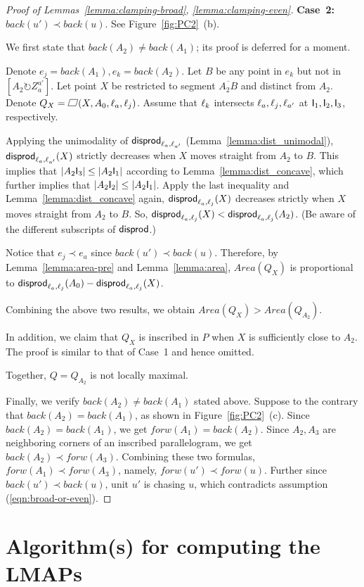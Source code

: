 \documentclass{ws-ijcga}
\begin{document}
\begin{proof}[Proof of Lemmas~\ref{lemma:clamping-broad}, \ref{lemma:clamping-even}]
\bigskip \noindent \textbf{Case~2:} $back(u')\prec back(u)$. See Figure~\ref{fig:PC2}~(b).

We first state that $back(A_2)\neq back(A_1)$; its proof is deferred for a moment.

Denote $e_j=back(A_1),e_k=back(A_2)$.
Let $B$ be any point in $e_k$ but not in $[A_2\circlearrowright Z_a^{a'}]$.
Let point $X$ be restricted to segment $\overline{A_2B}$ and distinct from $A_2$.
Denote $Q_X=\parallelogram(X,A_0,\el_a,\el_j)$.
Assume that $\ell_k$ intersects $\ell_a,\ell_j,\ell_{a'}$ at $\mathsf{I}_1,\mathsf{I}_2,\mathsf{I}_3$, respectively.\smallskip

Applying the unimodality of $\mathsf{disprod}_{\ell_a,\ell_{a'}}$ (Lemma~\ref{lemma:dist_unimodal}), $\mathsf{disprod}_{\ell_a,\ell_{a'}}(X)$ strictly decreases when $X$ moves straight from $A_2$ to $B$. This implies that $|A_2\mathsf{I}_3|\leq |A_2\mathsf{I}_1|$ according to Lemma~\ref{lemma:dist_concave}, which further implies that $|A_2\mathsf{I}_2|\leq |A_2\mathsf{I}_1|$. Apply the last inequality and Lemma~\ref{lemma:dist_concave} again, $\mathsf{disprod}_{\ell_a,\ell_j}(X)$ decreases strictly when $X$ moves straight from $A_2$ to $B$. So, $\mathsf{disprod}_{\ell_a,\ell_j}(X)<\mathsf{disprod}_{\ell_a,\ell_j}(A_2)$.
(Be aware of the different subscripts of $\mathsf{disprod}$.)

\smallskip Notice that $e_j\prec e_a$ since $back(u')\prec back(u)$. Therefore, by Lemma~\ref{lemma:area-pre} and Lemma~\ref{lemma:area}, $Area(Q_X)$ is proportional to $\mathsf{disprod}_{\ell_a,\ell_j}(A_0)-\mathsf{disprod}_{\ell_a,\ell_j}(X)$.

Combining the above two results, we obtain $Area(Q_X)>Area(Q_{A_2})$.

In addition, we claim that $Q_X$ is inscribed in $P$ when $X$ is sufficiently close to $A_2$. The proof is similar to that of Case~1 and hence omitted.

Together, $Q=Q_{A_2}$ is not locally maximal.

\medskip Finally, we verify $back(A_2)\neq back(A_1)$ stated above.
Suppose to the contrary that $back(A_2)=back(A_1)$, as shown in Figure~\ref{fig:PC2}~(c).
Since $back(A_2)=back(A_1)$, we get $forw(A_1)=back(A_2)$.
Since $A_2,A_3$ are neighboring corners of an inscribed parallelogram, we get $back(A_2)\prec forw(A_3)$.
Combining these two formulas, $forw(A_1)\prec forw(A_3)$, namely, $forw(u')\prec forw(u)$.
Further since $back(u')\prec back(u)$, unit $u'$ is chasing $u$, which contradicts assumption (\ref{eqn:broad-or-even}).
 \end{proof}

\section{Algorithm(s) for computing the LMAPs}\label{sect:algo}
\end{document}

